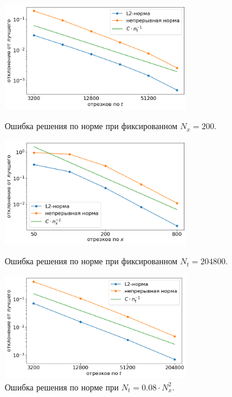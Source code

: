 \begin{figure}[!tp]
    \centering
    \includegraphics[width=0.72\textwidth]{figures/convergence_fixed_nx.png}
    \vspace{-0.2cm}
    \caption{Ошибка решения по норме при фиксированном $N_x = 200$.}
    \label{fig:convergence_fixed_nx}
    \vspace{0.6cm}
    
    \includegraphics[width=0.72\textwidth]{figures/convergence_fixed_nt.png}
    \vspace{-0.2cm}
    \caption{Ошибка решения по норме при фиксированном $N_t = 204800$.}
    \label{fig:convergence_fixed_nt}
    \vspace{0.6cm}
    
    \includegraphics[width=0.72\textwidth]{figures/convergence_connected.png}
    \vspace{-0.2cm}
    \caption{Ошибка решения по норме при $N_t = 0.08 \cdot N_x^2$.}
    \label{fig:convergence_connected}
\end{figure}


